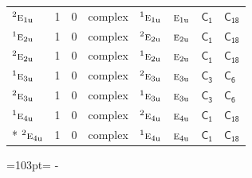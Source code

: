 \documentclass[10pt,a4paper]{article}
\newcommand{\needspace}[1]{\par\penalty-100\begingroup\dimen0=#1\relax\dimen2=\pagegoal
  \advance\dimen2-\pagetotal\ifdim\dimen0>\dimen2\relax\ifdim\dimen2>0pt\vfil\break\fi\fi
  \endgroup}
\numberwithin{equation}{section}
\newcommand{\grp}[1]{\mathsf{#1}}
\newcommand{\irr}[1]{\text{\normalfont\scshape #1}}
\newcommand{\conjpair}[1]{{}^{#1}}
\newcommand{\ptag}[1]{\mathrm{#1}}
\begin{document}
{\begin{longtable}{@{}lrrlllll@{}}
$\conjpair{2}\irr{e}_{1\ptag{u}}$ & 1 & $0$ & complex & $\conjpair{1}\irr{e}_{1\ptag{u}}$ & $\irr{e}_{1\ptag{u}}$ & \href{C1.pdf}{$\grp{C_{1}}$} & $\grp{C_{18}}$\\
$\conjpair{1}\irr{e}_{2\ptag{u}}$ & 1 & $0$ & complex & $\conjpair{2}\irr{e}_{2\ptag{u}}$ & $\irr{e}_{2\ptag{u}}$ & \href{C1.pdf}{$\grp{C_{1}}$} & $\grp{C_{18}}$\\
$\conjpair{2}\irr{e}_{2\ptag{u}}$ & 1 & $0$ & complex & $\conjpair{1}\irr{e}_{2\ptag{u}}$ & $\irr{e}_{2\ptag{u}}$ & \href{C1.pdf}{$\grp{C_{1}}$} & $\grp{C_{18}}$\\
$\conjpair{1}\irr{e}_{3\ptag{u}}$ & 1 & $0$ & complex & $\conjpair{2}\irr{e}_{3\ptag{u}}$ & $\irr{e}_{3\ptag{u}}$ & \href{C3.pdf}{$\grp{C_{3}}$} & \href{C6.pdf}{$\grp{C_{6}}$}\\
$\conjpair{2}\irr{e}_{3\ptag{u}}$ & 1 & $0$ & complex & $\conjpair{1}\irr{e}_{3\ptag{u}}$ & $\irr{e}_{3\ptag{u}}$ & \href{C3.pdf}{$\grp{C_{3}}$} & \href{C6.pdf}{$\grp{C_{6}}$}\\
$\conjpair{1}\irr{e}_{4\ptag{u}}$ & 1 & $0$ & complex & $\conjpair{2}\irr{e}_{4\ptag{u}}$ & $\irr{e}_{4\ptag{u}}$ & \href{C1.pdf}{$\grp{C_{1}}$} & $\grp{C_{18}}$\\*
$\conjpair{2}\irr{e}_{4\ptag{u}}$ & 1 & $0$ & complex & $\conjpair{1}\irr{e}_{4\ptag{u}}$ & $\irr{e}_{4\ptag{u}}$ & \href{C1.pdf}{$\grp{C_{1}}$} & $\grp{C_{18}}$\\
\bottomrule\end{longtable}}
\needspace{103pt}
\end{document}
